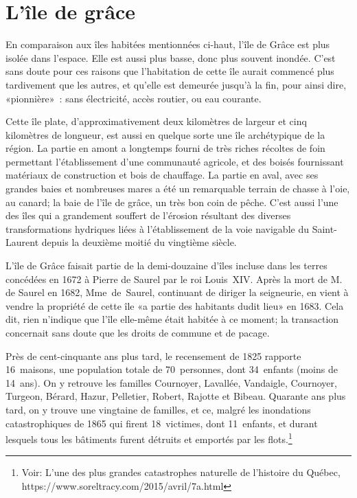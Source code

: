 \documentclass[12pt]{article}
\begin{document}
\section*{L'île de grâce}

En comparaison aux îles habitées mentionnées ci-haut, l'île de Grâce est plus isolée dans l'espace. Elle est aussi plus basse, donc plus souvent inondée. C'est sans doute pour ces raisons que l'habitation de cette île aurait commencé plus tardivement que les autres, et qu'elle est demeurée jusqu'à la fin, pour ainsi dire, «pionnière» : sans électricité, accès routier, ou eau courante.

Cette île plate, d'approximativement deux kilomètres de largeur et cinq kilomètres de longueur, est aussi en quelque sorte une île archétypique de la région. La partie en amont a longtemps fourni de très riches récoltes de foin permettant l'établissement d'une communauté agricole, et des boisés fournissant matériaux de construction et bois de chauffage. La partie en aval, avec ses grandes baies et nombreuses mares a été un remarquable terrain de chasse à l'oie, au canard; la baie de l'île de grâce, un très bon coin de pêche. C'est aussi l'une des îles qui a grandement souffert de l'érosion résultant des diverses transformations hydriques liées à l'établissement de la voie navigable du Saint-Laurent depuis la deuxième moitié du vingtième siècle.


L'île de Grâce faisait partie de la demi-douzaine d'îles incluse dans les terres concédées en 1672 à Pierre de Saurel par le roi Louis XIV. Après la mort de M. de Saurel en 1682, Mme de Saurel, continuant de diriger la seigneurie, en vient à vendre la propriété de cette île «a partie des habitants dudit lieu» en 1683. Cela dit, rien n'indique que l'île elle-même était habitée à ce moment; la transaction concernait sans doute que les droits de commune et de pacage. 

Près de cent-cinquante ans plus tard, le recensement de 1825 rapporte 16 maisons, une population totale de 70 personnes, dont 34 enfants (moins de 14 ans). On y retrouve les familles Cournoyer, Lavallée, Vandaigle, Cournoyer, Turgeon, Bérard, Hazur, Pelletier, Robert, Rajotte et Bibeau. Quarante ans plus tard, on y trouve une vingtaine de familles, et ce, malgré les inondations catastrophiques de 1865 qui firent 18 victimes, dont 11 enfants, et durant lesquels tous les bâtiments furent détruits et emportés par les flots.\footnote{Voir: L'une des plus grandes catastrophes naturelle de l'histoire du Québec, https://www.soreltracy.com/2015/avril/7a.html}
\end{document}
